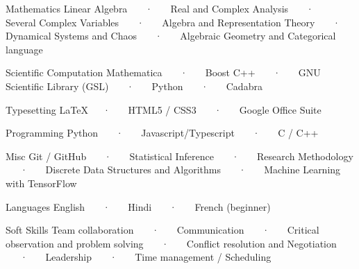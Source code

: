 

\begin{cvskills}

  \cvskill
    {Mathematics} %
    {Linear Algebra ~~~·~~~ Real and Complex Analysis ~~~·~~~ Several Complex Variables ~~~·~~~ Algebra
    and Representation Theory ~~~·~~~ Dynamical Systems and Chaos ~~~·~~~ Algebraic Geometry and Categorical language} %

  \cvskill
    {Scientific Computation} %
    {Mathematica ~~~·~~~ Boost C++ ~~~·~~~ GNU Scientific Library (GSL) ~~~·~~~ Python ~~~·~~~ Cadabra} %

  \cvskill
    {Typesetting} %
    {\LaTeX ~~~·~~~ HTML5 / CSS3 ~~~·~~~ Google Office Suite} %

  \cvskill
    {Programming} %
    {Python ~~~·~~~ Javascript/Typescript ~~~·~~~ C / C++} %

  \cvskill
    {Misc} %
    {Git / GitHub ~~~·~~~ Statistical Inference ~~~·~~~ Research Methodology ~~~·~~~ Discrete Data Structures and Algorithms ~~~·~~~ Machine Learning with TensorFlow} %

  \cvskill
    {Languages} %
    {English ~~~·~~~ Hindi ~~~·~~~ French (beginner)} %

  \cvskill
    {Soft Skills} %
    {Team collaboration ~~~·~~~ Communication ~~~·~~~ Critical observation and problem solving ~~~·~~~
    Conflict resolution and Negotiation ~~~·~~~ Leadership ~~~·~~~ Time management / Scheduling} %

\end{cvskills}
